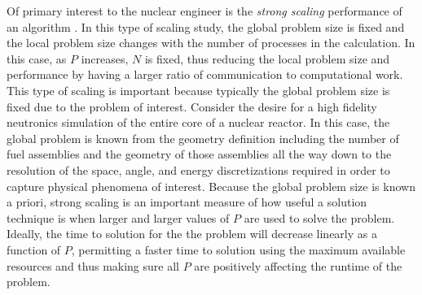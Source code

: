 Of primary interest to the nuclear engineer is the \textit{strong
  scaling} performance of an algorithm
\citep{siegel_analysis_2012}. In this type of scaling study, the
global problem size is fixed and the local problem size changes with
the number of processes in the calculation. In this case, as $P$
increases, $N$ is fixed, thus reducing the local problem size and
performance by having a larger ratio of communication to computational
work. This type of scaling is important because typically the global
problem size is fixed due to the problem of interest. Consider the
desire for a high fidelity neutronics simulation of the entire core of
a nuclear reactor. In this case, the global problem is known from the
geometry definition including the number of fuel assemblies and the
geometry of those assemblies all the way down to the resolution of the
space, angle, and energy discretizations required in order to capture
physical phenomena of interest. Because the global problem size is
known a priori, strong scaling is an important measure of how useful a
solution technique is when larger and larger values of $P$ are used to
solve the problem. Ideally, the time to solution for the the problem
will decrease linearly as a function of $P$, permitting a faster time
to solution using the maximum available resources and thus making sure
all $P$ are positively affecting the runtime of the problem.

